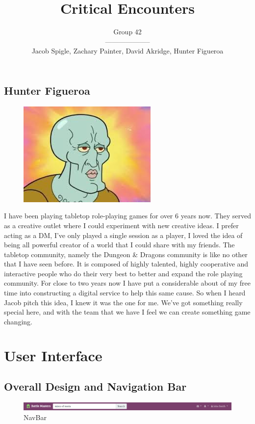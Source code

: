 \documentclass[12pt,a4paper]{report}
\author{Group 42 \\ -------------------- \\Jacob Spigle, Zachary Painter, David Akridge, Hunter Figueroa}
\title{Critical Encounters}
\begin{document}
	
	\newpage
	\section{Hunter Figueroa}
	\begin{figure}
		\includegraphics[scale=0.05]{Hunter_Figueroa}
	\end{figure}
	I have been playing tabletop role-playing games for over 6 years now. They served as a creative outlet where I could experiment with new creative ideas. I prefer acting as a DM, I’ve only played a single session as a player, I loved the idea of being all powerful creator of a world that I could share with my friends. The tabletop community, namely the Dungeon \& Dragons community is like no other that I have seen before. It is composed of highly talented, highly cooperative  and interactive people who do their very best to better and expand the role playing community. For close to two years now I have put a considerable about of my free time into constructing a digital service to help this same cause. So when I heard Jacob pitch this idea, I knew it was the one for me. We’ve got something really special here, and with the team that we have I feel we can create something game changing.
	
	\chapter*{User Interface}
	\section{Overall Design and Navigation Bar}
	\begin{figure}[H]
		\centering
		\centerline{\includegraphics[scale=.30]{navbar}}
		\caption{NavBar}
		\label{fig: NavBar}
	\end{figure}
\end{document}
